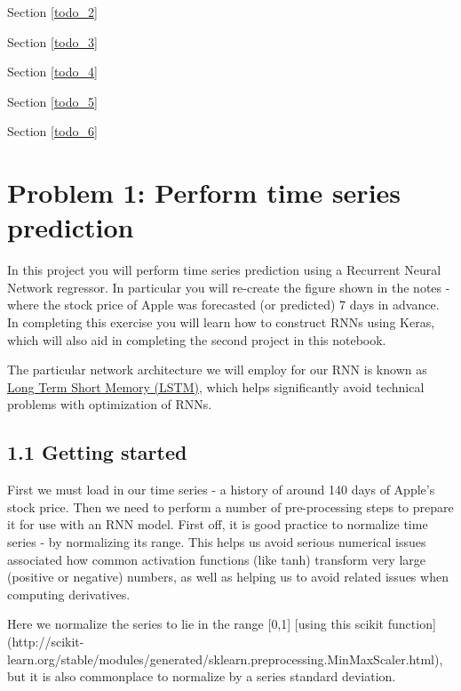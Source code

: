 \documentclass[11pt]{article}
\begin{document}
Section \ref{todo_2}

Section \ref{todo_3}

Section \ref{todo_4}

Section \ref{todo_5}

Section \ref{todo_6}

    \section{Problem 1: Perform time series
prediction}\label{problem-1-perform-time-series-prediction}

In this project you will perform time series prediction using a
Recurrent Neural Network regressor. In particular you will re-create the
figure shown in the notes - where the stock price of Apple was
forecasted (or predicted) 7 days in advance. In completing this exercise
you will learn how to construct RNNs using Keras, which will also aid in
completing the second project in this notebook.

The particular network architecture we will employ for our RNN is known
as \href{https://en.wikipedia.org/wiki/Long_short-term_memory}{Long Term
Short Memory (LSTM)}, which helps significantly avoid technical problems
with optimization of RNNs.

    \subsection{1.1 Getting started}\label{getting-started}

First we must load in our time series - a history of around 140 days of
Apple's stock price. Then we need to perform a number of pre-processing
steps to prepare it for use with an RNN model. First off, it is good
practice to normalize time series - by normalizing its range. This helps
us avoid serious numerical issues associated how common activation
functions (like tanh) transform very large (positive or negative)
numbers, as well as helping us to avoid related issues when computing
derivatives.

Here we normalize the series to lie in the range {[}0,1{]} {[}using this
scikit
function{]}(http://scikit-learn.org/stable/modules/generated/sklearn.preprocessing.MinMaxScaler.html),
but it is also commonplace to normalize by a series standard deviation.
\end{document}
